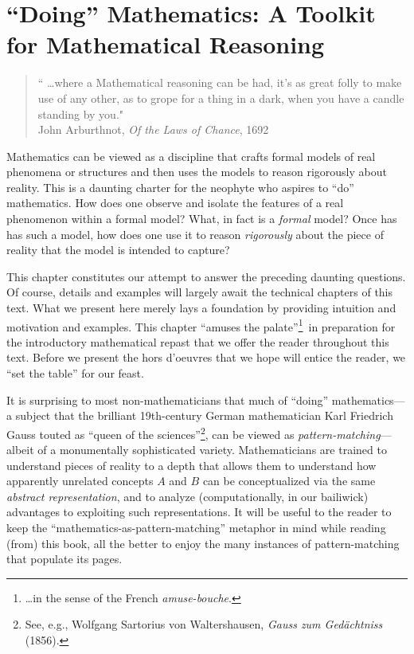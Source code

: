 
\chapter{``Doing'' Mathematics:
A Toolkit for Mathematical Reasoning}
\label{ch:doingmath}


\begin{quote}
`` \ldots where a Mathematical reasoning can be had, it's as great folly to make use of any other, as to grope for a thing in a dark, when you have a candle standing by you." \\
\hspace*{2in} John Arburthnot, {\it Of the Laws of Chance}, 1692
\end{quote}

\bigskip

\noindent
Mathematics can be viewed as a discipline that crafts formal models of real phenomena or structures and then uses the models to reason rigorously about reality.  This is a daunting charter for the neophyte who aspires to ``do'' mathematics.  How does one observe and isolate
the features of a real phenomenon within a formal model?  What, in fact is a {\em formal} model?  Once has has such a model, how does one use it to reason {\em rigorously} about the piece of reality that the model is intended to capture?

This chapter constitutes our attempt to answer the preceding daunting questions.  Of course, details and examples will largely await the technical chapters of this text.  What we present here merely lays a foundation by providing intuition and motivation and examples.  This chapter ``amuses the palate''\footnote{\ldots in the sense of the French {\em amuse-bouche}.}~in preparation for the introductory mathematical repast that we offer the reader throughout this text.   Before we present the hors d'oeuvres that we hope will entice the reader, we ``set the table'' for our feast.

\medskip

It is surprising to most non-mathematicians that much of ``doing'' mathematics---a subject that the brilliant 19th-century German mathematician Karl Friedrich Gauss touted as ``queen of the sciences''\footnote{See, e.g., Wolfgang Sartorius von Waltershausen, {\it Gauss zum Ged\"{a}chtniss} (1856).}, can be viewed as {\em pattern-matching}---albeit of a monumentally sophisticated variety.  Mathematicians are trained to understand pieces of reality to a depth that allows them to understand how apparently unrelated concepts $A$ and $B$ can be conceptualized via the same {\em abstract representation}, and to analyze (computationally, in our bailiwick) advantages to exploiting such representations.  It will be useful to the reader to keep the ``mathematics-as-pattern-matching'' metaphor in mind while reading (from) this book, all the better to enjoy the many instances of pattern-matching that populate its pages.

